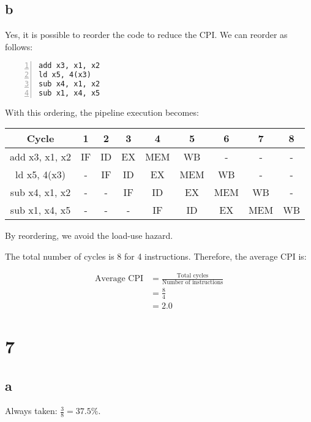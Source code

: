 \documentclass[12pt]{article}
\begin{document}
\subsection*{b}
Yes, it is possible to reorder the code to reduce the CPI. We can reorder as follows:

\begin{lstlisting}[basicstyle=\ttfamily\small, numbers=left, numberstyle=\tiny\color{gray}, stepnumber=1, frame=single]
add x3, x1, x2
ld x5, 4(x3)
sub x4, x1, x2
sub x1, x4, x5
\end{lstlisting}

With this ordering, the pipeline execution becomes:

\begin{table}[h!]
    \centering
    \begin{tabular}{|c|c|c|c|c|c|c|c|c|}
    \hline
    Cycle             & 1  & 2  & 3  & 4   & 5   & 6   & 7   & 8   \\
    \hline
    add x3, x1, x2    & IF & ID & EX & MEM & WB  & -   & -   & -   \\
    ld x5, 4(x3)      & -  & IF & ID & EX  & MEM & WB  & -   & -   \\
    sub x4, x1, x2    & -  & -  & IF & ID  & EX  & MEM & WB  & -   \\
    sub x1, x4, x5    & -  & -  & -  & IF  & ID  & EX  & MEM & WB  \\
    \hline
    \end{tabular}
\end{table}

By reordering, we avoid the load-use hazard.

The total number of cycles is 8 for 4 instructions. Therefore, the average CPI is:

\begin{align*}
\text{Average CPI} &= \frac{\text{Total cycles}}{\text{Number of instructions}} \\
&= \frac{8}{4} \\
&= 2.0
\end{align*}

\section*{7}

\subsection*{a}

Always taken: $\frac{3}{8} = 37.5\%$.
\end{document}
